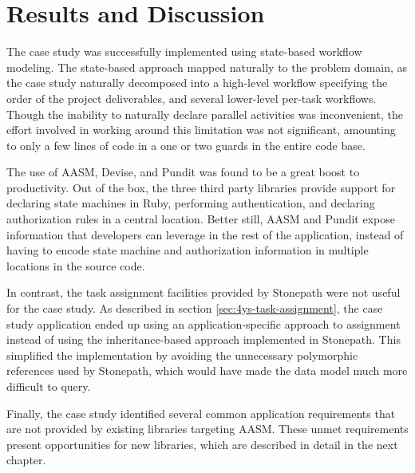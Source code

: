 \documentclass[document.tex]{subfiles}
\begin{document}
\section {Results and Discussion}

The case study was successfully implemented using state-based workflow modeling. The state-based approach mapped naturally to the problem domain, as the case study naturally decomposed into a high-level workflow specifying the order of the project deliverables, and several lower-level per-task workflows.
Though the inability to naturally declare parallel activities was inconvenient, the effort involved in working around this limitation was not significant, amounting to only a few lines of code in a one or two guards in the entire code base.

The use of AASM, Devise, and Pundit was found to be a great boost to productivity. Out of the box, the three third party libraries provide support for declaring state machines in Ruby, performing authentication, and declaring authorization rules in a central location. Better still, AASM and Pundit expose information that developers can leverage in the rest of the application, instead of having to encode state machine and authorization information in multiple locations in the source code.

In contrast, the task assignment facilities provided by Stonepath were not useful for the case study. As described in section \ref{sec:4ys-task-assignment}, the case study application ended up using an application-specific approach to assignment instead of using the inheritance-based approach implemented in Stonepath. This simplified the implementation by avoiding the unnecessary polymorphic references used by Stonepath, which would have made the data model much more difficult to query.

Finally, the case study identified several common application requirements that are not provided by existing libraries targeting AASM. These unmet requirements present opportunities for new libraries, which are described in detail in the next chapter.
\end{document}
